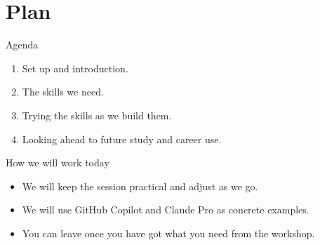 \section{Plan}

\begin{frame}{Agenda}
  \begin{enumerate}
    \item Set up and introduction.
    \item The skills we need.
    \item Trying the skills as we build them.
    \item Looking ahead to future study and career use.
  \end{enumerate}
\end{frame}

\begin{frame}{How we will work today}
  \begin{itemize}
    \item We will keep the session practical and adjust as we go.
    \item We will use GitHub Copilot and Claude Pro as concrete examples.
    \item You can leave once you have got what you need from the workshop.
  \end{itemize}
\end{frame}
